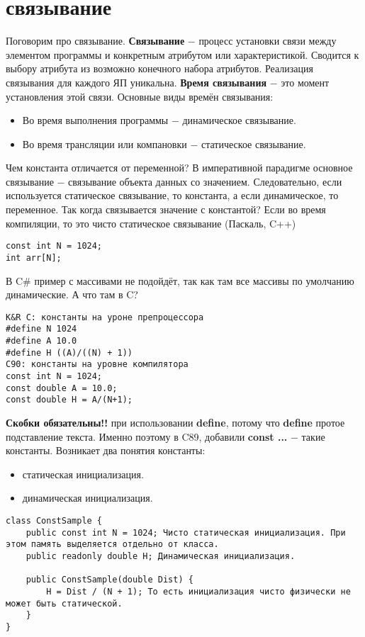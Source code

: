 \documentclass[a4paper, 12pt, titlepage, finall]{extreport}
\begin{document}
        \section{связывание}
            Поговорим про связывание. \textbf{Связывание} $-$ процесс установки связи между элементом программы и конкретным атрибутом или характеристикой.
            Сводится к выбору атрибута из возможно конечного набора атрибутов. Реализация связывания для каждого ЯП уникальна.
            \textbf{Время связывания} $-$ это момент установления этой связи. Основные виды времён связывания:
            \begin{itemize}
                \item Во время выполнения программы $-$ динамическое связывание.
                \item Во время трансляции или компановки $-$ статическое связывание.
            \end{itemize}
            Чем константа отличается от переменной?
            В императивной парадигме основное связывание $-$ связывание объекта данных со значением.
            Следовательно, если используется статическое связывание, то константа, а если динамическое, то переменное.
            Так когда связывается значение с константой? Если во время компиляции, то это чисто статическое связывание 
            (Паскаль, C++)
\begin{lstlisting}
const int N = 1024;
int arr[N];
\end{lstlisting}
            В C\# пример с массивами не подойдёт, так как там все массивы по умолчанию динамические.
            А что там в C?
\begin{lstlisting}
K&R C: константы на уроне препроцессора
#define N 1024
#define A 10.0
#define H ((A)/((N) + 1))
C90: константы на уровне компилятора
const int N = 1024;
const double A = 10.0;
const double H = A/(N+1);
\end{lstlisting}
            \textbf{Скобки обязательны!!} при использовании \textbf{define}, потому что \textbf{define} протое подставление текста. 
            Именно поэтому в C89, добавили \textbf{const ...} $-$ такие константы.
            Возникает два понятия константы:
            \begin{itemize}
                \item статическая инициализация.
                \item динамическая инициализация.
            \end{itemize}
\begin{lstlisting}
class ConstSample {
    public const int N = 1024; Чисто статическая инициализация. При этом память выделяется отдельно от класса.
    public readonly double H; Динамическая инициализация.

    public ConstSample(double Dist) {
        H = Dist / (N + 1); То есть инициализация чисто физически не может быть статической.
    }
}
\end{lstlisting}
\end{document}

